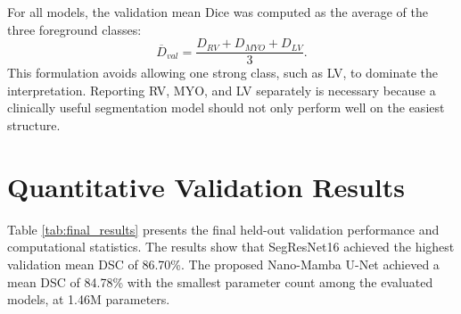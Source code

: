 For all models, the validation mean Dice was computed as the average of the three foreground classes:
\begin{equation}
    \overline{D}_{val}=\frac{D_{RV}+D_{MYO}+D_{LV}}{3}.
\end{equation}
This formulation avoids allowing one strong class, such as LV, to dominate the interpretation. Reporting RV, MYO, and LV separately is necessary because a clinically useful segmentation model should not only perform well on the easiest structure.

\section{Quantitative Validation Results}
Table \ref{tab:final_results} presents the final held-out validation performance and computational statistics. The results show that SegResNet16 achieved the highest validation mean DSC of 86.70\%. The proposed Nano-Mamba U-Net achieved a mean DSC of 84.78\% with the smallest parameter count among the evaluated models, at 1.46M parameters.

\begin{table}[hbt!]
\caption{Held-out patient-level validation results on the ACDC training cohort. Intervals are post-hoc patient-level percentile-bootstrap 95\% intervals (10,000 replicates); the same validation set was used for checkpoint selection.}
\label{tab:final_results}
\centering
{}
\end{table}

